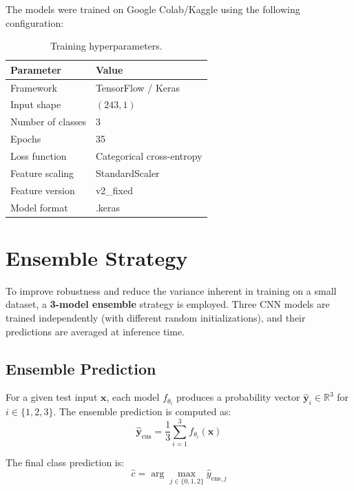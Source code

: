 \documentclass[12pt,a4paper]{report}
\begin{document}
The models were trained on Google Colab/Kaggle using the following configuration:

\begin{table}[H]
\centering
\caption{Training hyperparameters.}
\label{tab:training_config}
\begin{tabular}{ll}
\toprule
\textbf{Parameter} & \textbf{Value} \\
\midrule
Framework          & TensorFlow / Keras \\
Input shape        & $(243, 1)$ \\
Number of classes  & 3 \\
Epochs             & 35 \\
Loss function      & Categorical cross-entropy \\
Feature scaling    & StandardScaler \\
Feature version    & v2\_fixed \\
Model format       & .keras \\
\bottomrule
\end{tabular}
\end{table}


\section{Ensemble Strategy}
\label{sec:ensemble}

To improve robustness and reduce the variance inherent in training on a small dataset, a \textbf{3-model ensemble} strategy is employed. Three CNN models are trained independently (with different random initializations), and their predictions are averaged at inference time.

\subsection{Ensemble Prediction}

For a given test input $\mathbf{x}$, each model $f_{\theta_i}$ produces a probability vector $\hat{\mathbf{y}}_i \in \mathbb{R}^3$ for $i \in \{1, 2, 3\}$. The ensemble prediction is computed as:
\begin{equation}
    \hat{\mathbf{y}}_{\text{ens}} = \frac{1}{3} \sum_{i=1}^{3} f_{\theta_i}(\mathbf{x})
\label{eq:ensemble}
\end{equation}

The final class prediction is:
\begin{equation}
    \hat{c} = \arg\max_{j \in \{0,1,2\}} \hat{y}_{\text{ens},j}
\end{equation}
\end{document}
